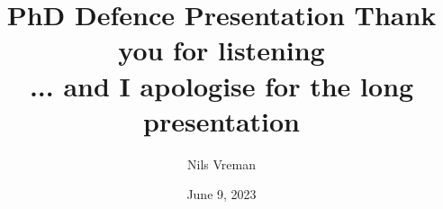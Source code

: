 \documentclass[aspectratio=169]{beamer}
\title[PhD Defence]{%
    \Huge PhD Defence Presentation
}
\author[Nils Vreman]{%
    \vspace{1cm}
    \LARGE Nils Vreman
}
\date[June 9]{%
    \vspace{5mm}
    June 9, 2023
}
\begin{document}
 
\logooff{}













\title[PhD Defence]{%
    {\Huge Thank you for listening}\\
    {\tiny ... and I apologise for the long presentation}
}
\author[Nils Vreman]{}
\date[]{}
\notitlelogo{}


\extraframesbegin{}




\extraframesend{}
\logoon{}
\end{document}

